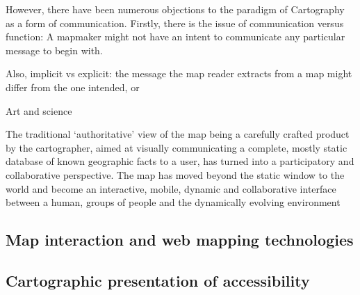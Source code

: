 However, there have been numerous objections to the paradigm of Cartography as a form of communication.
Firstly, there is the issue of communication versus function:
A mapmaker might not have an intent to communicate any particular message to begin with.

Also, implicit vs explicit:
the message the map reader extracts from a map might differ from the one intended, or


Art and science \parencite{mac2004, tyn1992}  %



\parencite{kra2017}
The traditional ‘authoritative’ view of the map being a carefully crafted product
by the cartographer, aimed at visually communicating a complete, mostly static database
of known geographic facts to a user, has turned into a participatory and collaborative perspective.
The map has moved beyond the static window to the world and become an
interactive, mobile, dynamic and collaborative interface between a human, groups of
people and the dynamically evolving environment

\subsection{Map interaction and web mapping technologies}

\textcite{rot2013a, rot2013b}

\subsection{Cartographic presentation of accessibility}



